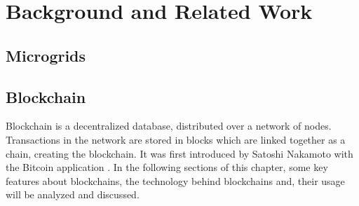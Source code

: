 \chapter{Background and Related Work}
\section{Microgrids}




\section{Blockchain}
Blockchain is a decentralized database, distributed over a network of nodes. Transactions in the network are stored in blocks which are linked together as a chain, creating the blockchain. It was first introduced by Satoshi Nakamoto with the Bitcoin application \cite{Nakamoto_bitcoin}.
In the following sections of this chapter, some key features about blockchains, the technology behind blockchains and, their usage will be analyzed and discussed. 

